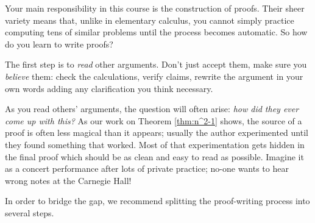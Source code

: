\label{sec:proofplan}

Your main responsibility in this course is the construction of proofs. Their sheer variety means that, unlike in elementary calculus, you cannot simply practice computing tens of similar problems until the process becomes automatic. So how do you learn to write proofs?\smallbreak

The first step is to \emph{read} other arguments. Don't just accept them, make sure you \emph{believe} them: check the calculations, verify claims, rewrite the argument in your own words adding any clarification you think necessary.\smallbreak

As you read others' arguments, the question will often arise: \emph{how did they ever come up with this?} As our work on Theorem \ref{thm:n^2-1} shows, the source of a proof is often less magical than it appears; usually the author experimented until they found something that worked. Most of that experimentation gets hidden in the final proof which should be as clean and easy to read as possible. Imagine it as a concert performance after lots of private practice; no-one wants to hear wrong notes at the Carnegie Hall!\smallbreak

In order to bridge the gap, we recommend splitting the proof-writing process into several steps.

